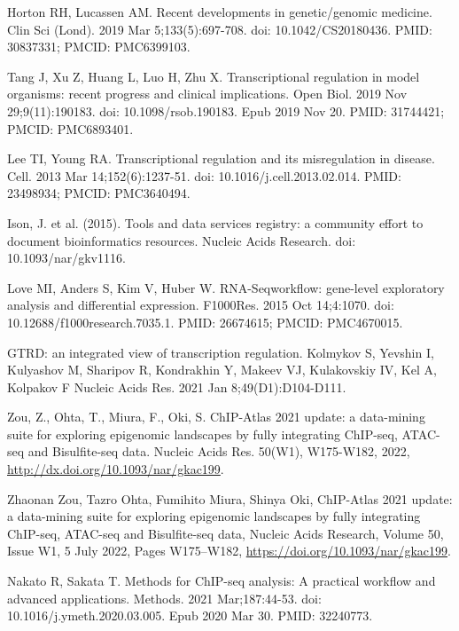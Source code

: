 \documentclass[12pt]{article}
\begin{document}

\begin{thebibliography}{99}

 Horton RH, Lucassen AM. Recent developments in
genetic/genomic medicine. Clin Sci (Lond). 2019 Mar 5;133(5):697-708.
doi: 10.1042/CS20180436. PMID: 30837331; PMCID: PMC6399103.

 Tang J, Xu Z, Huang L, Luo H, Zhu X. Transcriptional
regulation in model organisms: recent progress and clinical implications.
Open Biol. 2019 Nov 29;9(11):190183. doi: 10.1098/rsob.190183.
Epub 2019 Nov 20. PMID: 31744421; PMCID: PMC6893401.

 Lee TI, Young RA. Transcriptional regulation and its
misregulation in disease. Cell. 2013 Mar 14;152(6):1237-51.
doi: 10.1016/j.cell.2013.02.014. PMID: 23498934; PMCID: PMC3640494.

 Ison, J. et al. (2015). Tools and data services registry: a
community effort to document bioinformatics resources. Nucleic Acids Research.
doi: 10.1093/nar/gkv1116.

 Love MI, Anders S, Kim V, Huber W. RNA-Seqworkflow:
gene-level exploratory analysis and differential expression. F1000Res.
2015 Oct 14;4:1070. doi: 10.12688/f1000research.7035.1. PMID: 26674615;
PMCID: PMC4670015.

 GTRD: an integrated view of transcription regulation.
Kolmykov S, Yevshin I, Kulyashov M, Sharipov R, Kondrakhin Y, Makeev VJ,
Kulakovskiy IV, Kel A, Kolpakov F Nucleic Acids Res. 2021 Jan
8;49(D1):D104-D111.

 Zou, Z., Ohta, T., Miura, F., Oki, S. ChIP-Atlas 2021
update: a data-mining suite for exploring epigenomic landscapes by fully
integrating ChIP-seq, ATAC-seq and Bisulfite-seq data. Nucleic Acids Res.
50(W1), W175-W182, 2022, \newline
\url{http://dx.doi.org/10.1093/nar/gkac199}.

 Zhaonan Zou, Tazro Ohta, Fumihito Miura, Shinya Oki,
ChIP-Atlas 2021 update: a data-mining suite for exploring epigenomic landscapes
by fully integrating ChIP-seq, ATAC-seq and Bisulfite-seq data, Nucleic Acids
Research, Volume 50, Issue W1, 5 July 2022, Pages W175–W182,
\url{https://doi.org/10.1093/nar/gkac199}.

 Nakato R, Sakata T. Methods for ChIP-seq analysis: A
practical workflow and advanced applications. Methods. 2021 Mar;187:44-53.
doi: 10.1016/j.ymeth.2020.03.005. Epub 2020 Mar 30. PMID: 32240773.


\end{thebibliography}
\end{document}
